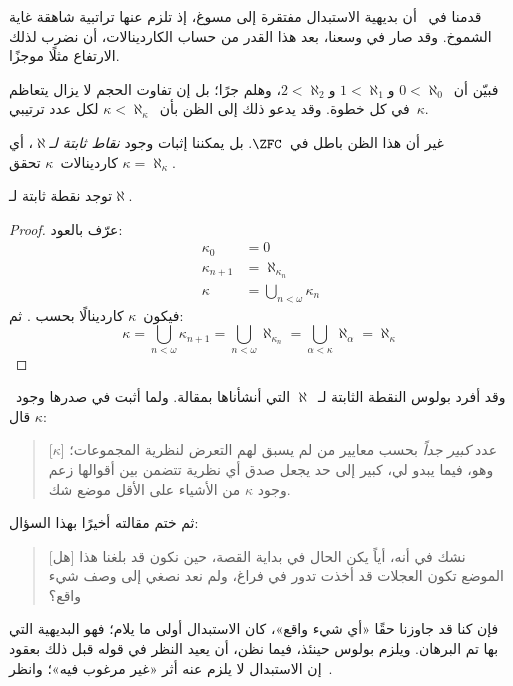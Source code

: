 \documentclass[../../../include/open-logic-section]{subfiles}
\begin{document}

قدمنا في~ أن بديهية الاستبدال مفتقرة إلى مسوغ،
إذ تلزم عنها تراتبية شاهقة غاية الشموخ. وقد صار في وسعنا، بعد هذا القدر
من حساب الكاردينالات، أن نضرب لذلك الارتفاع مثلًا موجزًا.

فبيّن أن~$0 < \aleph_0$ و$1 < \aleph_1$ و$2 < \aleph_2$، وهلم
جرًا؛ بل إن تفاوت الحجم لا يزال يتعاظم في كل خطوة. وقد يدعو ذلك إلى
الظن بأن~$\kappa< \aleph_\kappa$ لكل عدد ترتيبي~$\kappa$.

غير أن هذا الظن باطل في~$\ZFC$. بل يمكننا إثبات وجود
\emph{نقاط ثابتة لـ$\aleph$}، أي كاردينالات~$\kappa$ تحقق
$\kappa=\aleph_\kappa$.

\begin{prop}
توجد نقطة ثابتة لـ$\aleph$.
\end{prop}

\begin{proof}
عرّف بالعود:
\begin{align*}
	\kappa_0 &= 0\\
	\kappa_{n+1} &= \aleph_{\kappa_n}\\
	\kappa&= \bigcup_{n < \omega}\kappa_n
\end{align*}
فيكون~$\kappa$ كاردينالًا بحسب
. ثم:
\[
	\kappa= \bigcup_{n < \omega} \kappa_{n+1} =
	\bigcup_{n < \omega}\aleph_{\kappa_n} =
	\bigcup_{\alpha < \kappa}\aleph_\alpha = \aleph_\kappa
\]
\end{proof}

وقد أفرد بولوس النقطة الثابتة لـ~$\aleph$ التي أنشأناها بمقالة. ولما
أثبت في صدرها وجود~$\kappa$ قال:
\begin{quote}
	[$\kappa$] عدد \emph{كبير جداً} بحسب معايير من لم يسبق لهم التعرض
	لنظرية المجموعات؛ وهو، فيما يبدو لي، كبير إلى حد يجعل صدق أي نظرية
	تتضمن بين أقوالها زعم وجود $\kappa$ من الأشياء على الأقل موضع شك.
	\citep[p.~257]{Boolos2000}
\end{quote}
ثم ختم مقالته أخيرًا بهذا السؤال:
\begin{quote}
	[هل] نشك في أنه، أياً يكن الحال في بداية القصة، حين نكون قد بلغنا هذا
	الموضع تكون العجلات قد أخذت تدور في فراغ، ولم نعد نصغي إلى وصف شيء
	واقع؟
	\citep[p.~268]{Boolos2000}
\end{quote}
فإن كنا قد جاوزنا حقًا «أي شيء واقع»، كان الاستبدال أولى ما يلام؛ فهو
البديهية التي بها تم البرهان. ويلزم بولوس حينئذ، فيما نظن، أن يعيد النظر
في قوله قبل ذلك بعقود إن الاستبدال لا يلزم عنه أثر «غير مرغوب فيه»؛
وانظر~.
\end{document}
